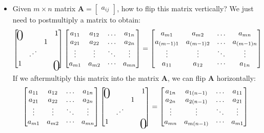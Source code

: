\begin{itemize}
\begin{proof}
\[\begin{bmatrix}
\rho cos\theta sin\varphi + \rho sin\theta cos\varphi
\end{bmatrix} = \begin{bmatrix}
\rho cos(\theta + \varphi)\\
\rho sin(\theta + \varphi)
\end{bmatrix}
\]
This is the form that this vector has been rotated anticlockwise by the angle $\theta$.
\end{proof}
\item
Given $m\times n$ matrix $\bm A = \begin{bmatrix}
a_{ij}
\end{bmatrix}$, how to flip this matrix vertically? We just need to postmultiply a matrix to obtain:
\[
\left[
\begin{array}{@{}cccc@{}}
\bigzero &  &  & 1  \\
 &  & 1 &   \\
    & \iddots    &  &     \\
1 &  &  &  \bigzero
\end{array}
\right]
\left[
\begin{array}{@{}cccc@{}}
a_{11} & a_{12} & \dots & a_{1n}  \\
a_{21} & a_{22} & \dots & a_{2n}  \\
\vdots    & \vdots    & \ddots & \vdots    \\
a_{m1} & a_{m2} & \cdots & a_{mn} 
\end{array}
\right]
 = \left[
\begin{array}{@{}cccc@{}}
a_{m1} & a_{m2} & \dots & a_{mn}  \\
a_{(m-1)1} & a_{(m-1)2} & \dots & a_{(m-1)n}  \\
\vdots    & \vdots    & \ddots & \vdots    \\
a_{11} & a_{12} & \cdots & a_{1n} 
\end{array}
\right]
\]
If we aftermultiply this matrix into the matrix $\bm A$, we can flip $\bm A$ horizontally:
\[
\left[
\begin{array}{@{}cccc@{}}
a_{11} & a_{12} & \dots & a_{1n}  \\
a_{21} & a_{22} & \dots & a_{2n}  \\
\vdots    & \vdots    & \ddots & \vdots    \\
a_{m1} & a_{m2} & \cdots & a_{mn} 
\end{array}
\right]\left[
\begin{array}{@{}cccc@{}}
\bigzero &  &  & 1  \\
 &  & 1 &   \\
    & \iddots    &  &     \\
1 &  &  &  \bigzero
\end{array}
\right] = \left[
\begin{array}{@{}cccc@{}}
a_{1n} & a_{1(n-1)} & \dots & a_{11}  \\
a_{2n} & a_{2(n-1)} & \dots & a_{21}  \\
\vdots    & \vdots    & \ddots & \vdots    \\
a_{mn} & a_{m(n-1)} & \cdots & a_{m1} 
\end{array}
\right]
\]
\end{itemize}
